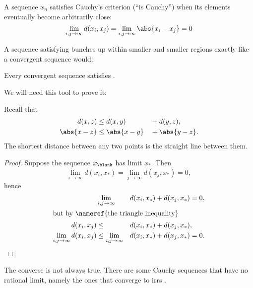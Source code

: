 \documentclass{scrartcl}
\newcommand{\dist}{d}
\begin{document}
\begin{defn}\label{Cauchy's criterion}
  A sequence \(x_{n}\) satisfies Cauchy's criterion (``is Cauchy'') when its elements eventually become arbitrarily close:
  \[
    \lim_{i,j\to\infty} d(x_{i},x_{j})=\lim_{i,j\to \infty} \abs{x_{i}-x_{j}} =0
  \]
\end{defn}
A sequence satisfying  bunches up within smaller and smaller regions exactly like a convergent sequence would:
\begin{theorem}
  Every convergent sequence satisfies .
\end{theorem}
We will need this tool to prove it:
\begin{lemma}\label{the triangle inequality}
  Recall that
  \begin{alignat*}{3}
    \dist(x,z)&\leq d(x,y)&&+d(y,z),\\
    \abs{x-z}&\leq \abs{x-y}&&+\abs{y-z}.
  \end{alignat*}
  The shortest distance between any two points is the straight line between them.
\end{lemma}
\begin{proof}

  Suppose the sequence \(x_{\blank}\) has limit \(x_{*}\). Then
  \[
    \lim_{i\to\infty} \dist(x_{i},x_*) = \lim_{j\to\infty} \dist(x_{j},x_{*})=0,
  \]
  hence
  \begin{alignat*}{3}
    &\lim_{i,j\to\infty}&&\dist(x_{i},x_{*})+\dist(x_{j},x_{*}) = 0, \\
    \shortintertext{but by \nameref{the triangle inequality}}
    \dist(x_{i},x_{j}) &\leq &&\dist(x_{i},x_{*}) + \dist(x_{j},x_{*}), \\
    \lim_{i,j\to \infty} \dist(x_{i},x_{j}) &\leq \lim_{i,j\to \infty} &&\dist(x_{i},x_{*})+\dist(x_{j},x_{*}) = 0.
  \end{alignat*}
\end{proof}
The converse is not always true. There are some Cauchy sequences that have no rational limit, namely the ones that converge to
irr\colorbox{darkgray}{}s
.
\end{document}
